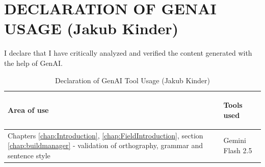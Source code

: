\section{DECLARATION OF GENAI USAGE (Jakub Kinder)}
\label{chap:genaiJK}



I declare that I have critically analyzed and verified the content generated with the help of GenAI.


\begin{table}[H]
\caption{Declaration of GenAI Tool Usage (Jakub Kinder)}
\label{tab:genaiJK}
\begin{center}
\begin{tabular}{|p{}|p{}|}
    \hline
    \begin{center}
       \textbf{Area of use}
   \end{center}
   & \begin{center}
       \textbf{Tools used}
   \end{center}
   \\ \hline
   Chapters \ref{chap:Introduction}, \ref{chap:FieldIntroduction}, section \ref{chap:buildmanager} - validation of orthography, grammar and sentence style & Gemini Flash 2.5 \\
\hline
\end{tabular}
\end{center}
\end{table}


